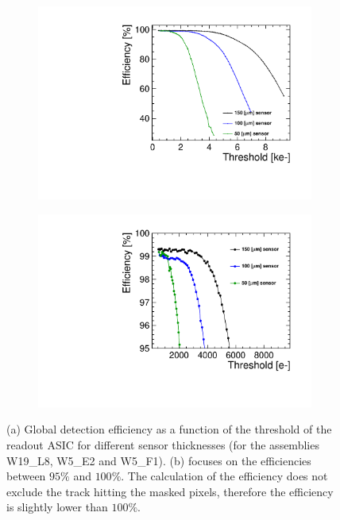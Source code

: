 \begin{figure}[htbp] 
  \centering
  \begin{subfigure}[b]{0.45\textwidth}
    \includegraphics[width=\textwidth]{./figures/TestBeam/Efficiency_vs_THL.pdf}
    \caption{}
  \end{subfigure}\hfill
  \begin{subfigure}[b]{0.45\textwidth}
    \includegraphics[width=\textwidth]{./figures/TestBeam/Efficiency_vs_THL_zoom.pdf}
    \caption{}
  \end{subfigure}
  \caption{(a) Global detection efficiency as a function of the
    threshold of the readout ASIC for different sensor thicknesses
    (for the assemblies W19\_L8, W5\_E2 and W5\_F1). (b) focuses on
    the efficiencies between $95\%$ and $100\%$. The calculation of
    the efficiency does not exclude the track hitting the masked
    pixels, therefore the efficiency is slightly lower than $100\%$.}
  \label{fig:efficiency_VS_Threshold}
\end{figure}


